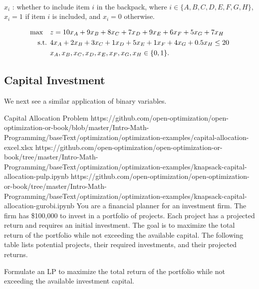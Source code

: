 \begin{solution}
 \\
$x_i$ : whether to include item $i$ in the backpack, where $i \in \{A, B, C, D, E, F, G, H\}$, $x_i = 1$ if item $i$ is included, and $x_i = 0$ otherwise.

\smallskip {}
\begin{align*}
\max \quad & z = 10x_A + 9x_B + 8x_C + 7x_D + 9x_E + 6x_F + 5x_G + 7x_H \\
\text{ s.t. }        & 4x_A + 2x_B + 3x_C + 1x_D + 5x_E + 1x_F + 4x_G + 0.5x_H \le 20 \\
& x_A, x_B, x_C, x_D, x_E, x_F, x_G, x_H \in \{0,1\}.
\end{align*}
\end{solution}

\subsection{Capital Investment}
We next see a similar application of binary variables.
\begin{examplewithallcode}{Capital Allocation Problem}
{https://github.com/open-optimization/open-optimization-or-book/blob/master/Intro-Math-Programming/baseText/optimization/optimization-examples/capital-allocation-excel.xlsx}
{https://github.com/open-optimization/open-optimization-or-book/tree/master/Intro-Math-Programming/baseText/optimization/optimization-examples/knapsack-capital-allocation-pulp.ipynb}
{https://github.com/open-optimization/open-optimization-or-book/tree/master/Intro-Math-Programming/baseText/optimization/optimization-examples/knapsack-capital-allocation-gurobi.ipynb}
You are a financial planner for an investment firm. The firm has \$100,000 to invest in a portfolio of projects. Each project has a projected return and requires an initial investment. The goal is to maximize the total return of the portfolio while not exceeding the available capital. The following table lists potential projects, their required investments, and their projected returns.

Formulate an LP to maximize the total return of the portfolio while not exceeding the available investment capital.
\end{examplewithallcode}

